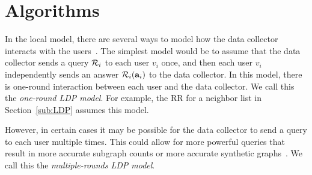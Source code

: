 \section{Algorithms}
\label{sec:algorithms}
In the local model, 
there 
are several ways 
to 
model how the data collector interacts with 
the users~\cite{Duchi_FOCS13,Joseph_SODA20,Qin_CCS17}.
The simplest model 
would be 
to assume that 
the data collector sends 
a 
query $\mathcal{R}_i$ to each user $v_i$ once, 
and then 
each user $v_i$ independently sends an answer $\mathcal{R}_i(\mathbf{a}_i)$ to the data collector. 
In this model, there is one-round interaction between each user and the data collector. 
We call this the
\textit{one-round LDP model}. 
For example, the RR 
for a neighbor list in Section~\ref{sub:LDP} assumes this model.

However, in certain cases it may be possible 
for the data collector to send a query to each user multiple times. 
This could allow for more powerful queries that result in more accurate 
subgraph counts 
\cite{Sun_CCS19} 
or more accurate synthetic graphs~\cite{Qin_CCS17}. 
We call this the \textit{multiple-rounds LDP model}. 


